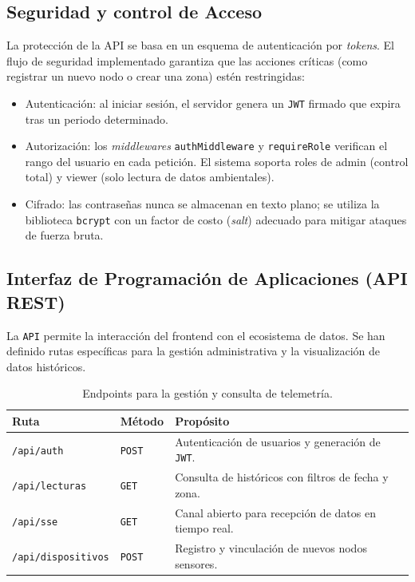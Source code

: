 \subsection{Seguridad y control de Acceso}

La protección de la API se basa en un esquema de autenticación por \textit{tokens}. El flujo de seguridad implementado garantiza que las acciones críticas (como registrar un nuevo nodo o crear una zona) estén restringidas:

\begin{itemize}
    \item Autenticación: al iniciar sesión, el servidor genera un \texttt{JWT} firmado que expira tras un periodo determinado.
    \item Autorización: los \textit{middlewares} \texttt{authMiddleware} y \texttt{requireRole} verifican el rango del usuario en cada petición. El sistema soporta roles de admin (control total) y viewer (solo lectura de datos ambientales).
    \item Cifrado: las contraseñas nunca se almacenan en texto plano; se utiliza la biblioteca \texttt{bcrypt} con un factor de costo (\textit{salt}) adecuado para mitigar ataques de fuerza bruta.
\end{itemize}

\subsection{Interfaz de Programación de Aplicaciones (API REST)}

La \texttt{API} permite la interacción del frontend con el ecosistema de datos. Se han definido rutas específicas para la gestión administrativa y la visualización de datos históricos.

\begin{table}[h]
    \centering
    \caption[Resumen de rutas principales de la API]{Endpoints para la gestión y consulta de telemetría.}
    \label{tab:rutas-api}
    \begin{tabular}{p{4cm} p{2cm} p{6cm}}
        \toprule
        \textbf{Ruta} & \textbf{Método} & \textbf{Propósito} \\
        \midrule
        \texttt{/api/auth} & \texttt{POST} & Autenticación de usuarios y generación de \texttt{JWT}. \\
        \texttt{/api/lecturas} & \texttt{GET} & Consulta de históricos con filtros de fecha y zona. \\
        \texttt{/api/sse} & \texttt{GET} & Canal abierto para recepción de datos en tiempo real. \\
        \texttt{/api/dispositivos} & \texttt{POST} & Registro y vinculación de nuevos nodos sensores. \\
        \bottomrule
    \end{tabular}
\end{table}

